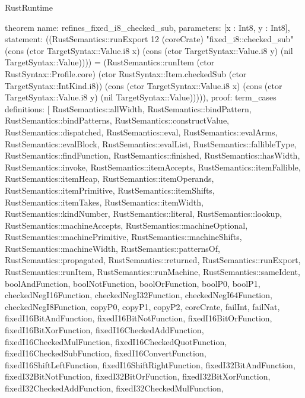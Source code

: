 \begin{lexlean}{RustRuntime}
\begin{semanticmodule}
theorem{
  name: refines_fixed_i8_checked_sub,
  parameters: [x : Int8, y : Int8],
  statement: ((RustSemantics::runExport 12 (coreCrate) "fixed_i8::checked_sub" (cons (ctor TargetSyntax::Value.i8 x) (cons (ctor TargetSyntax::Value.i8 y) (nil TargetSyntax::Value)))) = (RustSemantics::runItem (ctor RustSyntax::Profile.core) (ctor RustSyntax::Item.checkedSub (ctor TargetSyntax::IntKind.i8)) (cons (ctor TargetSyntax::Value.i8 x) (cons (ctor TargetSyntax::Value.i8 y) (nil TargetSyntax::Value))))),
  proof: term_cases{
    definitions: [
      RustSemantics::allWidth,
      RustSemantics::bindPattern,
      RustSemantics::bindPatterns,
      RustSemantics::constructValue,
      RustSemantics::dispatched,
      RustSemantics::eval,
      RustSemantics::evalArms,
      RustSemantics::evalBlock,
      RustSemantics::evalList,
      RustSemantics::fallibleType,
      RustSemantics::findFunction,
      RustSemantics::finished,
      RustSemantics::hasWidth,
      RustSemantics::invoke,
      RustSemantics::itemAccepts,
      RustSemantics::itemFallible,
      RustSemantics::itemHeap,
      RustSemantics::itemOperands,
      RustSemantics::itemPrimitive,
      RustSemantics::itemShifts,
      RustSemantics::itemTakes,
      RustSemantics::itemWidth,
      RustSemantics::kindNumber,
      RustSemantics::literal,
      RustSemantics::lookup,
      RustSemantics::machineAccepts,
      RustSemantics::machineOptional,
      RustSemantics::machinePrimitive,
      RustSemantics::machineShifts,
      RustSemantics::machineWidth,
      RustSemantics::patternsOf,
      RustSemantics::propagated,
      RustSemantics::returned,
      RustSemantics::runExport,
      RustSemantics::runItem,
      RustSemantics::runMachine,
      RustSemantics::sameIdent,
      boolAndFunction,
      boolNotFunction,
      boolOrFunction,
      boolP0,
      boolP1,
      checkedNegI16Function,
      checkedNegI32Function,
      checkedNegI64Function,
      checkedNegI8Function,
      copyP0,
      copyP1,
      copyP2,
      coreCrate,
      failInt,
      failNat,
      fixedI16BitAndFunction,
      fixedI16BitNotFunction,
      fixedI16BitOrFunction,
      fixedI16BitXorFunction,
      fixedI16CheckedAddFunction,
      fixedI16CheckedMulFunction,
      fixedI16CheckedQuotFunction,
      fixedI16CheckedSubFunction,
      fixedI16ConvertFunction,
      fixedI16ShiftLeftFunction,
      fixedI16ShiftRightFunction,
      fixedI32BitAndFunction,
      fixedI32BitNotFunction,
      fixedI32BitOrFunction,
      fixedI32BitXorFunction,
      fixedI32CheckedAddFunction,
      fixedI32CheckedMulFunction,
}}
\end{semanticmodule}
\end{lexlean}
